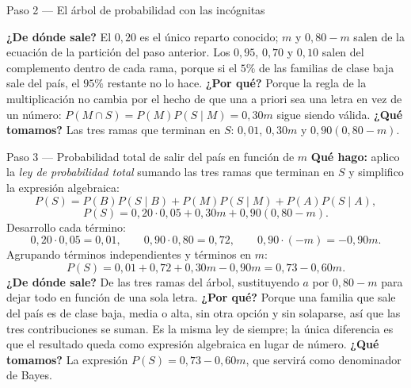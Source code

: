 \documentclass[11pt]{article}
\begin{document}
\begin{sol}
\begin{paso}{Paso 2 --- El árbol de probabilidad con las incógnitas}
\begin{center}
\shorthandon{<>}
\end{center}

\textbf{¿De dónde sale?} El $0,20$ es el único reparto conocido; $m$ y $0,80-m$ salen de la ecuación de la partición del paso anterior. Los $0,95$, $0,70$ y $0,10$ salen del complemento dentro de cada rama, porque si el $5\%$ de las familias de clase baja sale del país, el $95\%$ restante no lo hace.
\textbf{¿Por qué?} Porque la regla de la multiplicación no cambia por el hecho de que una a priori sea una letra en vez de un número: $P(M\cap S)=P(M)P(S\mid M)=0,30m$ sigue siendo válida.
\textbf{¿Qué tomamos?} Las tres ramas que terminan en $S$: $0,01$, $0,30m$ y $0,90(0,80-m)$.
\end{paso}

\begin{paso}{Paso 3 --- Probabilidad total de salir del país en función de $m$}
\textbf{Qué hago:} aplico la \emph{ley de probabilidad total} sumando las tres ramas que terminan en $S$ y simplifico la expresión algebraica:
\[
P(S)=P(B)P(S\mid B)+P(M)P(S\mid M)+P(A)P(S\mid A),
\]
\[
P(S)=0,20\cdot 0,05+0,30m+0,90(0,80-m).
\]
Desarrollo cada término:
\[
0,20\cdot 0,05=0,01,\qquad 0,90\cdot 0,80=0,72,\qquad 0,90\cdot(-m)=-0,90m .
\]
Agrupando términos independientes y términos en $m$:
\[
P(S)=0,01+0,72+0,30m-0,90m=0,73-0,60m .
\]
\textbf{¿De dónde sale?} De las tres ramas del árbol, sustituyendo $a$ por $0,80-m$ para dejar todo en función de una sola letra.
\textbf{¿Por qué?} Porque una familia que sale del país es de clase baja, media o alta, sin otra opción y sin solaparse, así que las tres contribuciones se suman. Es la misma ley de siempre; la única diferencia es que el resultado queda como expresión algebraica en lugar de número.
\textbf{¿Qué tomamos?} La expresión $P(S)=0,73-0,60m$, que servirá como denominador de Bayes.
\end{paso}


\end{sol}
\end{document}
